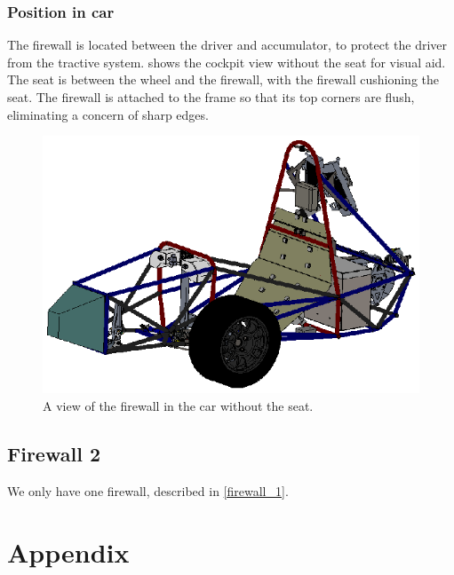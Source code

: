 \documentclass{article}
\begin{document}
\subsubsection{Position in car}
The firewall is located between the driver and accumulator, to protect the driver from the tractive system.  shows the cockpit view without the seat for visual aid. The seat is between the wheel and the firewall, with the firewall cushioning the seat.  The firewall is attached to the frame so that its top corners are flush, eliminating a concern of sharp edges.

\begin{figure}[H]
    \centering
    \includegraphics[width = 1 \textwidth]{firewall_in_car.png}
    \caption{A view of the firewall in the car without the seat. }
    \label{fig:firewall_in_car}
\end{figure}

\subsection{Firewall 2}\label{firewall_2}
We only have one firewall, described in \ref{firewall_1}.



\section{Appendix}\label{appendix}
\setcounter{subsection}{1}
\end{document}
